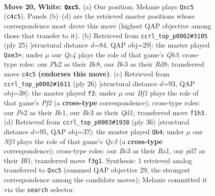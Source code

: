 \documentclass[11pt]{article}
\begin{document}
\clearpage

\begin{figure}[p]\centering
\begin{subfigure}{0.46\textwidth}\centering
\resizebox{\linewidth}{!}{%
\newchessgame
\chessboard[
  setfen={1rb2r2/p1ppqp2/2n1p2k/2n4p/2Q3p1/2B2NP1/PP2PP1P/2R1KB1R w - - 0 20},
  showmover=false,
  pgfstyle=straightmove, color=movearrow, markmove={c4-c5}
]}
\caption{}
\end{subfigure}\hfill
\begin{subfigure}{0.46\textwidth}\centering
\resizebox{\linewidth}{!}{%
\newchessgame
\chessboard[
  setfen={r1br2k1/1p1npp1p/1q3bp1/p2P4/4P3/1NN1Q3/PP3PPP/3RKB1R b K - 3 13},
  showmover=false,
  pgfstyle=straightmove, color=movearrow, markmove={b6-e3}
]}
\caption{}
\end{subfigure}
\\[4pt]
\begin{subfigure}{0.46\textwidth}\centering
\resizebox{\linewidth}{!}{%
\newchessgame
\chessboard[
  setfen={r1b1r1k1/ppq2pp1/5n1p/n1ppN3/P2P4/2PBP3/5PPP/R1BQR1K1 w - - 0 14},
  showmover=false,
  pgfstyle=straightmove, color=movearrow, markmove={f2-f3}
]}
\caption{}
\end{subfigure}\hfill
\begin{subfigure}{0.46\textwidth}\centering
\resizebox{\linewidth}{!}{%
\newchessgame
\chessboard[
  setfen={rnr3k1/p2pqppp/bn2p3/1N6/4PB1P/P1Q2PP1/1P6/R3KB1R w KQ - 1 19},
  showmover=false,
  pgfstyle=straightmove, color=movearrow, markmove={c3-b4}
]}
\caption{}
\end{subfigure}
\caption{\textbf{Move 20, White: \texttt{Qxc5}.} (a) Our position; Melanie plays \texttt{Qxc5} (\texttt{c4c5}). Panels (b)--(d) are the retrieved master positions whose correspondence most drove this move (highest QAP objective among those that transfer to it). (b) Retrieved from \texttt{ccrl\_top\_p0002\#3105} (ply 25) [structural distance $d$=84, QAP obj=29]: the master played \texttt{Qxe3+}; under $\mu$ our \emph{Qc4} plays the role of that game's \emph{Qb3}; cross-type roles: our \emph{P}h2 as their \emph{B}c8, our \emph{B}c3 as their \emph{R}d8; transferred move \texttt{c4c5} \textbf{(endorses this move)}. (c) Retrieved from \texttt{ccrl\_top\_p0002\#1611} (ply 26) [structural distance $d$=93, QAP obj=38]: the master played \texttt{f3}; under $\mu$ our \emph{Bf1} plays the role of that game's \emph{Pf2} (a \textbf{cross-type} correspondence); cross-type roles: our \emph{P}e2 as their \emph{B}c1, our \emph{B}c3 as their \emph{Q}d1; transferred move \texttt{f1h3}. (d) Retrieved from \texttt{ccrl\_top\_p0003\#1938} (ply 36) [structural distance $d$=95, QAP obj=37]: the master played \texttt{Qb4}; under $\mu$ our \emph{Nf3} plays the role of that game's \emph{Qc3} (a \textbf{cross-type} correspondence); cross-type roles: our \emph{B}c3 as their \emph{R}a1, our \emph{p}d7 as their \emph{B}f1; transferred move \texttt{f3g1}. Synthesis: 1 retrieved analog transferred to \texttt{Qxc5} (summed QAP objective 29, the strongest correspondence among the candidate moves); Melanie committed it via the \texttt{search} selector.}
\label{fig:thought-m38}
\end{figure}
\end{document}
